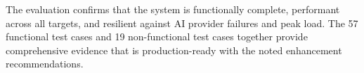 The evaluation confirms that the system is functionally complete, performant across all targets, and resilient against AI provider failures and peak load. The 57 functional test cases and 19 non-functional test cases together provide comprehensive evidence that \projectname{} is production-ready with the noted enhancement recommendations.

\endinput
